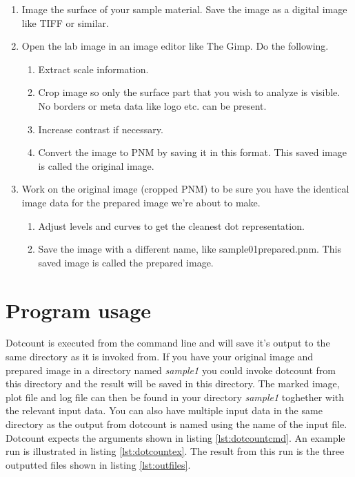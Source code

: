 \documentclass[a4paper,10pt]{book}
\begin{document}
\begin{enumerate}
  \label{lst:preproutine}
  \item Image the surface of your sample material. Save the image as a digital
image like TIFF or similar.
  \item Open the lab image in an image editor like The Gimp. Do the following.
  \begin{enumerate}
    \item Extract scale information.
    \item Crop image so only the surface part that you wish to analyze is
visible. No borders or meta data like logo etc. can be present.
    \item Increase contrast if necessary.
    \item Convert the image to PNM by saving it in this format. This saved
image is called the original image.
  \end{enumerate}
  \item Work on the original image (cropped PNM) to be sure you have the
identical image data for the prepared image we're about to make.
  \begin{enumerate}
    \item Adjust levels and curves to get the cleanest dot representation. 
    \item Save the image with a different name, like sample01prepared.pnm. This
saved image is called the prepared image.
  \end{enumerate}
\end{enumerate}

\chapter{Program usage}
\label{chap:usage}
Dotcount is executed from the command line and will save it's output to the
same directory as it is invoked from. If you have your original image and
prepared image in a directory named \textit{sample1} you could invoke dotcount
from this directory and the result will be saved in this directory. The
marked image, plot file and log file can then be found in your directory
\textit{sample1} toghether with the relevant input data. You can also have
multiple input data in the same directory as the output from dotcount is named
using the name of the input file. Dotcount expects the arguments shown in
listing \ref{lst:dotcountcmd}. An example run is illustrated in listing
\ref{lst:dotcountex}. The result from this run is the three outputted files
shown in listing \ref{lst:outfiles}.
\end{document}
